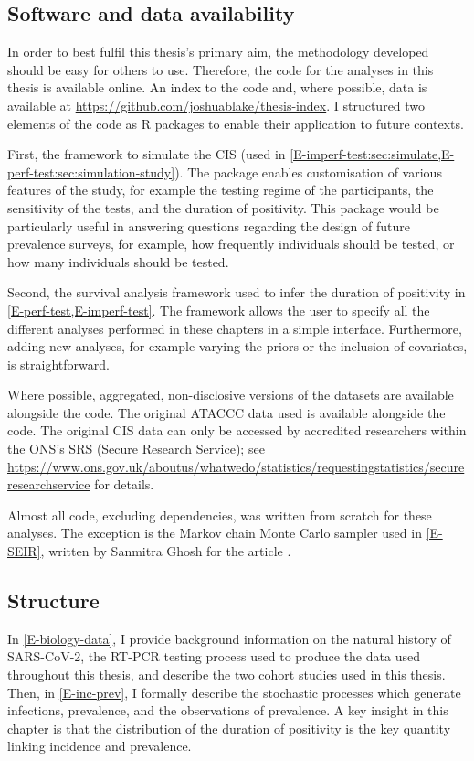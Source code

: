 \documentclass[thesis.tex]{subfiles}
\begin{document}
\subsection{Software and data availability}

In order to best fulfil this thesis's primary aim, the methodology developed should be easy for others to use.
Therefore, the code for the analyses in this thesis is available online.
An index to the code and, where possible, data is available at \url{https://github.com/joshuablake/thesis-index}.
I structured two elements of the code as R packages to enable their application to future contexts.

First, the framework to simulate the CIS (used in \cref{E-imperf-test:sec:simulate,E-perf-test:sec:simulation-study}).
The package enables customisation of various features of the study, for example the testing regime of the participants, the sensitivity of the tests, and the duration of positivity.
This package would be particularly useful in answering questions regarding the design of future prevalence surveys, for example, how frequently individuals should be tested, or how many individuals should be tested.

Second, the survival analysis framework used to infer the duration of positivity in \cref{E-perf-test,E-imperf-test}.
The framework allows the user to specify all the different analyses performed in these chapters in a simple interface. 
Furthermore, adding new analyses, for example varying the priors or the inclusion of covariates, is straightforward.

Where possible, aggregated, non-disclosive versions of the datasets are available alongside the code.
The original ATACCC data used is available alongside the code.
The original CIS data can only be accessed by accredited researchers within the ONS's SRS (Secure Research Service); see \url{https://www.ons.gov.uk/aboutus/whatwedo/statistics/requestingstatistics/secureresearchservice} for details.

Almost all code, excluding dependencies, was written from scratch for these analyses.
The exception is the Markov chain Monte Carlo sampler used in \cref{E-SEIR}, written by Sanmitra Ghosh for the article \textcite{ghoshApproximate}.

\subsection{Structure}

In \cref{E-biology-data}, I provide background information on the natural history of SARS-CoV-2, the RT-PCR testing process used to produce the data used throughout this thesis, and describe the two cohort studies used in this thesis.
Then, in \cref{E-inc-prev}, I formally describe the stochastic processes which generate infections, prevalence, and the observations of prevalence.
A key insight in this chapter is that the distribution of the duration of positivity is the key quantity linking incidence and prevalence.
\end{document}
